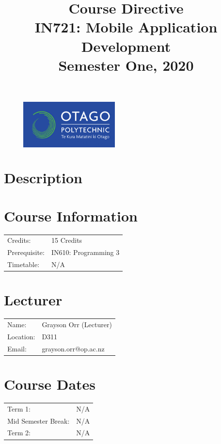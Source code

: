 \documentclass{article}
\author{}
\begin{document}
\begin{figure}
  \includegraphics[width=50mm]{../../resources/img/logo.png}
\end{figure}

\title{Course Directive\\IN721: Mobile Application Development\\Semester One, 2020}
\date{}
\maketitle

\section*{Description}

\section*{Course Information}
\begin{tabular}{ll}
  Credits:      & 15 Credits          \\
  Prerequisite: & IN610: Programming 3 \\
  Timetable:    & N/A                 \\
\end{tabular}

\section*{Lecturer}
\begin{tabular}{ll}
  Name:     & Grayson Orr (Lecturer) \\
  Location: & D311                   \\
  Email:    & grayson.orr@op.ac.nz   \\
\end{tabular}

\section*{Course Dates}
\begin{tabular}{ll}
  Term 1:             & N/A \\
  Mid Semester Break: & N/A \\
  Term 2:             & N/A \\
\end{tabular}
\end{document}
